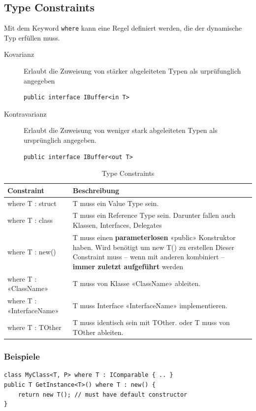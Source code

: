 \documentclass[
a4paper,
oneside,
10pt,
fleqn,
headsepline,
toc=listofnumbered, 
bibliography=totocnumbered]{scrartcl}
\begin{document}
\subsection{Type Constraints}
Mit dem Keyword \lstinline|where| kann eine Regel definiert werden, die der dynamische Typ erfüllen muss.

\begin{description}
	\item[Kovarianz] Erlaubt die Zuweisung von stärker abgeleiteten Typen als urprüfunglich angegeben
\begin{lstlisting}
public interface IBuffer<in T>
\end{lstlisting}
	\item[Kontravarianz] Erlaubt die Zuweisung von weniger stark abgeleiteten Typen als ursprünglich angegeben.
\begin{lstlisting}
public interface IBuffer<out T>
\end{lstlisting}
\end{description}

\begin{table}[h]
	\centering
	\begin{tabu} to \linewidth {l X}
		\toprule 
		Constraint & Beschreibung \\
		\midrule
		where T : struct & T muss ein Value Type sein. \\
		where T : class & T muss ein Reference Type sein. Darunter fallen auch Klassen, Interfaces, Delegates \\
		where T : new() & T muss einen \textbf{parameterlosen} «public» Konstruktor haben. Wird benötigt um new T() zu erstellen
		Dieser Constraint muss – wenn mit anderen kombiniert – \textbf{immer zuletzt 
		aufgeführt} werden  \\
		where T : «ClassName» & T muss von Klasse «ClassName» ableiten. \\
		where T : «InterfaceName» & T muss Interface «InterfaceName» implementieren. \\
		where T : TOther & T muss identisch sein mit TOther.
		oder
		T muss von TOther ableiten.  \\
		\bottomrule
	\end{tabu} 
	\caption{Type Constraints}
\end{table}
\subsubsection{Beispiele}
\begin{lstlisting}
class MyClass<T, P> where T : IComparable { .. }
public T GetInstance<T>() where T : new() {
	return new T(); // must have default constructor
}
\end{lstlisting}
\end{document}
